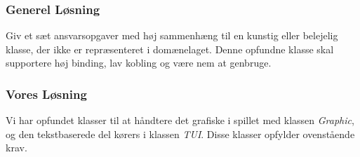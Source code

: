 \subsubsection*{Generel Løsning}
Giv et sæt ansvarsopgaver med høj sammenhæng til en kunstig eller belejelig klasse, der ikke er repræsenteret i domænelaget. Denne opfundne klasse skal supportere høj binding, lav kobling og være nem at genbruge.
\subsubsection*{Vores Løsning}
Vi har opfundet klasser til at håndtere det grafiske i spillet med klassen \textit{Graphic}, og den tekstbaserede del kørers i klassen \textit{TUI}. Disse klasser opfylder ovenstående krav.